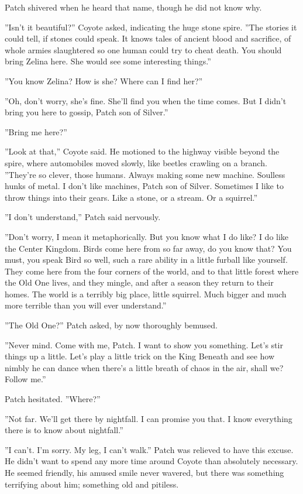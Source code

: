 \documentclass[12pt]{book}
\begin{document}
Patch shivered when he heard that name, though he did not know why.

''Isn't it beautiful?'' Coyote asked, indicating the huge stone spire. ''The stories it could tell, if stones could speak. It knows tales of ancient blood and sacrifice, of whole armies slaughtered so one human could try to cheat death. You should bring Zelina here. She would see some interesting things.''

''You know Zelina? How is she? Where can I find her?''

''Oh, don't worry, she's fine. She'll find you when the time comes. But I didn't bring you here to gossip, Patch son of Silver.''

''Bring me here?''

''Look at that,'' Coyote said. He motioned to the highway visible beyond the spire, where automobiles moved slowly, like beetles crawling on a branch. ''They're so clever, those humans. Always making some new machine. Soulless hunks of metal. I don't like machines, Patch son of Silver. Sometimes I like to throw things into their gears. Like a stone, or a stream. Or a squirrel.''

''I don't understand,'' Patch said nervously.

''Don't worry, I mean it metaphorically. But you know what I do like? I do like the Center Kingdom. Birds come here from so far away, do you know that? You must, you speak Bird so well, such a rare ability in a little furball like yourself. They come here from the four corners of the world, and to that little forest where the Old One lives, and they mingle, and after a season they return to their homes. The world is a terribly big place, little squirrel. Much bigger and much more terrible than you will ever understand.''

''The Old One?'' Patch asked, by now thoroughly bemused.

''Never mind. Come with me, Patch. I want to show you something. Let's stir things up a little. Let's play a little trick on the King Beneath and see how nimbly he can dance when there's a little breath of chaos in the air, shall we? Follow me.''

Patch hesitated. ''Where?''

''Not far. We'll get there by nightfall. I can promise you that. I know everything there is to know about nightfall.''

''I can't. I'm sorry. My leg, I can't walk.'' Patch was relieved to have this excuse. He didn't want to spend any more time around Coyote than absolutely necessary. He seemed friendly, his amused smile never wavered, but there was something terrifying about him; something old and pitiless.
\end{document}
